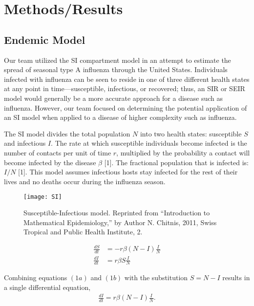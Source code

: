 \documentclass[11pt, oneside]{article}   	%
\begin{document}
\section{Methods/Results} 

\subsection{Endemic Model}
Our team utilized the SI compartment model in an attempt to estimate the spread of seasonal type A influenza through the United States. Individuals infected with influenza can be seen to reside in one of three different health states at any point in time---susceptible, infectious, or recovered; thus, an SIR or SEIR model would generally be a more accurate approach for a disease such as influenza. However, our team focused on determining the potential application of an SI model when applied to a disease of higher complexity such as influenza. 

The SI model divides the total population $N$ into two health states: susceptible $S$ and infectious $I$. The rate at which susceptible individuals become infected is the number of contacts per unit of time $r$, multiplied by the probability a contact will become infected by the disease $\beta$ [1]. The fractional population that is infected is: $I/N$ [1]. This model assumes infectious hosts stay infected for the rest of their lives and no deaths occur during the influenza season.

\clearpage
\begin{figure}[H]
\begin{center}
\texttt{[image: SI]}
\caption{Susceptible-Infectious model. Reprinted from ``Introduction to Mathematical Epidemiology,'' by Author N. Chitnis, 2011, Swiss Tropical and Public Health Institute, 2.}
\label{Susceptible-Infectious model.}
\end{center}
\end{figure} 

\begin{subequations}
\begin{align}
\frac{dS}{dt} &= -r \beta(N-I)\frac{I}{N} \\
\frac{dI}{dt}  &=  r \beta S \frac{I}{N}
\end{align}
\end{subequations}

\noindent Combining equations $(1a)$ and $(1b)$ with the substitution $S = N - I$ results in a single differential equation,
\begin{align}
\frac{dI}{dt} = r \beta (N-I) \frac{I}{N}.
\end{align}
\end{document}
